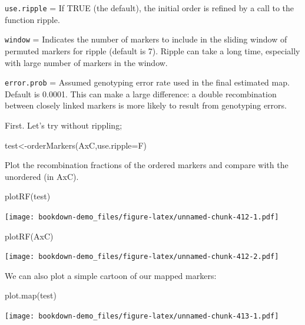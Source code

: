 \documentclass[
]{book}
\newenvironment{Shaded}{\begin{snugshade}}{\end{snugshade}}
\newcommand{\AttributeTok}[1]{\textcolor[rgb]{0.77,0.63,0.00}{#1}}
\newcommand{\FunctionTok}[1]{\textcolor[rgb]{0.00,0.00,0.00}{#1}}
\newcommand{\NormalTok}[1]{#1}
\newcommand{\OtherTok}[1]{\textcolor[rgb]{0.56,0.35,0.01}{#1}}
\begin{document}
\texttt{use.ripple} = If TRUE (the default), the initial order is refined by a call to the function ripple.

\texttt{window} = Indicates the number of markers to include in the sliding window of permuted markers for ripple (default is 7). Ripple can take a long time, especially with large number of markers in the window.

\texttt{error.prob} = Assumed genotyping error rate used in the final estimated map. Default is 0.0001. This can make a large difference: a double recombination between closely linked markers is more likely to result from genotyping errors.

First. Let's try without rippling;

\begin{Shaded}
\begin{Highlighting}[]
\NormalTok{test}\OtherTok{\textless{}{-}}\FunctionTok{orderMarkers}\NormalTok{(AxC,}\AttributeTok{use.ripple=}\NormalTok{F)}
\end{Highlighting}
\end{Shaded}

Plot the recombination fractions of the ordered markers and compare with the unordered (in AxC).

\begin{Shaded}
\begin{Highlighting}[]
\FunctionTok{plotRF}\NormalTok{(test)}
\end{Highlighting}
\end{Shaded}

\texttt{[image: bookdown-demo\_files/figure-latex/unnamed-chunk-412-1.pdf]}

\begin{Shaded}
\begin{Highlighting}[]
\FunctionTok{plotRF}\NormalTok{(AxC)}
\end{Highlighting}
\end{Shaded}

\texttt{[image: bookdown-demo\_files/figure-latex/unnamed-chunk-412-2.pdf]}

We can also plot a simple cartoon of our mapped markers:

\begin{Shaded}
\begin{Highlighting}[]
\FunctionTok{plot.map}\NormalTok{(test)}
\end{Highlighting}
\end{Shaded}

\texttt{[image: bookdown-demo\_files/figure-latex/unnamed-chunk-413-1.pdf]}
\end{document}
